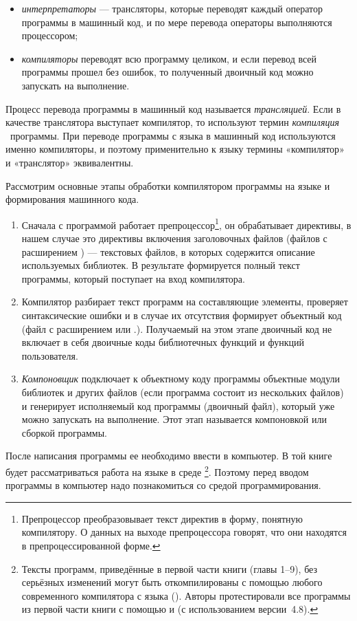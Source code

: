 \begin{itemize}
\item {}\emph{интерпретаторы} --- трансляторы, которые переводят 
каждый оператор программы в машинный код, и по мере перевода операторы
выполняются процессором; 
\item {}\emph{компиляторы} переводят всю программу целиком, и если 
перевод всей программы прошел без ошибок, то полученный двоичный код можно
запускать на выполнение. 
\end{itemize}
Процесс перевода программы в машинный код называется \emph{трансляцией}. 
Если в качестве транслятора выступает компилятор, то используют термин \emph{компиляция}%
~программы. При переводе программы с языка  в машинный код используются именно 
компиляторы, и поэтому применительно к
языку  термины «компилятор» и «транслятор» эквивалентны.

Рассмотрим основные этапы обработки компилятором программы на языке  и формирования машинного кода.

\begin{enumerate}
\item Сначала с программой работает препроцессор\footnote{Препроцессор преобразовывает
текст директив в форму, понятную компилятору. О данных на выходе препроцессора говорят, что они находятся
в препроцессированной форме.}, он обрабатывает директивы, в нашем случае это директивы включения
заголовочных файлов (файлов с расширением ) --- текстовых файлов, в которых содержится описание используемых
библиотек. В результате формируется полный текст программы, который поступает на вход компилятора. 
\item Компилятор разбирает текст программ на составляющие элементы, проверяет синтаксические ошибки и в случае их
отсутствия формирует объектный код (файл с расширением  или .). Получаемый на этом этапе
двоичный код не включает в себя двоичные коды библиотечных функций и функций пользователя.
\item \emph{Компоновщик} подключает к объектному коду программы объектные модули библиотек и других 
файлов (если программа состоит из нескольких
файлов) и генерирует исполняемый код программы (двоичный файл), который уже можно запускать на выполнение. Этот этап
называется компоновкой или сборкой программы.
\end{enumerate}

После написания программы ее необходимо ввести в компьютер. В той книге будет рассматриваться работа на языке  в
среде \footnote{Тексты программ, приведённые в первой части книги (главы 1--9), без серьёзных изменений
могут быть откомпилированы с помощью любого современного компилятора с языка (). Авторы протестировали все
программы из первой части книги с помощью   и   (с использованием  версии~4.8).}. 
Поэтому перед
вводом программы в компьютер надо познакомиться со средой программирования.

